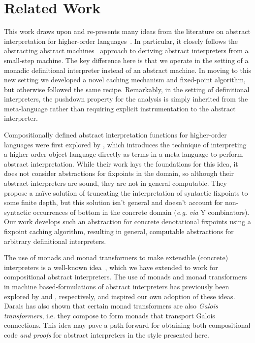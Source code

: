 \section{Related Work}\label{s:related-work}

This work draws upon and re-presents many ideas from the literature on
abstract interpretation for higher-order
languages~\cite{dvanhorn:Midtgaard2012Controlflow}.  In particular, it
closely follows the abstracting abstract
machines~\cite{dvanhorn:VanHorn2010Abstracting,dvanhorn:VanHorn2012Systematic}
approach to deriving abstract interpreters from a small-step
machine. The key difference here is that we operate in the setting of
a monadic definitional interpreter instead of an abstract machine. In
moving to this new setting we developed a novel caching mechanism and
fixed-point algorithm, but otherwise followed the same
recipe. Remarkably, in the setting of definitional interpreters, the
pushdown property for the analysis is simply inherited from the
meta-language rather than requiring explicit instrumentation to the
abstract interpreter.

Compositionally defined abstract interpretation functions for
higher-order languages were first explored by
\citet{local:jones-book1995}, which introduces the technique of
interpreting a higher-order object language directly as terms in a
meta-language to perform abstract interpretation. While their work
lays the foundations for this idea, it does not consider abstractions
for fixpoints in the domain, so although their abstract interpreters
are sound, they are not in general computable. They propose a naïve
solution of truncating the interpretation of syntactic fixpoints to
some finite depth, but this solution isn't general and doesn't account
for non-syntactic occurrences of bottom in the concrete domain (\emph{e.g.}
\emph{via} Y combinators). Our work develops such an abstraction for concrete
denotational fixpoints using a fixpoint caching algorithm, resulting in
general, computable abstractions for arbitrary definitional interpreters.

The use of monads and monad transformers to make extensible (concrete)
interpreters is a well-known
idea~\cite{davdar:Moggi:1989:Monads,local:steele-popl94,dvanhorn:Liang1995Monad},
which we have extended to work for compositional abstract
interpreters.  The use of monads and monad transformers in machine
based-formulations of abstract interpreters has previously been
explored by \citet{dvanhorn:Sergey2013Monadic} and
\citet{local:darais-oopsla2015}, respectively, and inspired our own
adoption of these ideas.  Darais has also shown that certain monad
transformers are also \emph{Galois transformers}, i.e. they compose to
form monads that transport Galois connections.  This idea may pave a
path forward for obtaining both compositional code \emph{and proofs}
for abstract interpreters in the style presented here.

